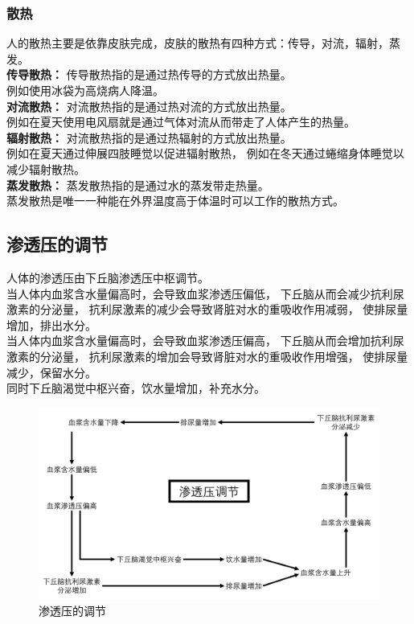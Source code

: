 \documentclass[UTF8]{ctexart}
\begin{document}
\subsubsection{散热}
    人的散热主要是依靠皮肤完成，皮肤的散热有四种方式：传导，对流，辐射，蒸发。\\[6mm]
    \textbf{传导散热：}
    传导散热指的是通过热传导的方式放出热量。\\[3mm]
    例如使用冰袋为高烧病人降温。\\[6mm]
    \textbf{对流散热：}
    对流散热指的是通过热对流的方式放出热量。\\[3mm]
    例如在夏天使用电风扇就是通过气体对流从而带走了人体产生的热量。\\[6mm]
    \textbf{辐射散热：}
    对流散热指的是通过热辐射的方式放出热量。\\[3mm]
    例如在夏天通过伸展四肢睡觉以促进辐射散热，
    例如在冬天通过蜷缩身体睡觉以减少辐射散热。\\[6mm]
    \textbf{蒸发散热：}
    蒸发散热指的是通过水的蒸发带走热量。\\[3mm]
    蒸发散热是唯一一种能在外界温度高于体温时可以工作的散热方式。\\[4mm]

\newpage
    
\subsection{渗透压的调节}
    人体的渗透压由下丘脑渗透压中枢调节。\\[3mm]
    当人体内血浆含水量偏高时，会导致血浆渗透压偏低，
    下丘脑从而会减少抗利尿激素的分泌量，
    抗利尿激素的减少会导致肾脏对水的重吸收作用减弱，
    使排尿量增加，排出水分。\\[3mm]
    当人体内血浆含水量偏高时，会导致血浆渗透压偏高，
    下丘脑从而会增加抗利尿激素的分泌量，
    抗利尿激素的增加会导致肾脏对水的重吸收作用增强，
    使排尿量减少，保留水分。\\[3mm]
    同时下丘脑渴觉中枢兴奋，饮水量增加，补充水分。
    \begin{figure}[h]
        \begin{center}
            \includegraphics[width=14cm]{BiologyImage/53.jpg}
        \end{center}
        \caption{渗透压的调节}
    \end{figure}
\end{document}
